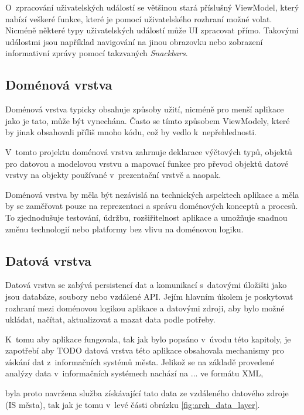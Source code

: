 O~zpracování uživatelských událostí se většinou stará příslušný ViewModel, který nabízí veškeré funkce, které je pomocí uživatelského rozhraní možné volat.
Nicméně některé typy uživatelských událostí může UI zpracovat přímo. Takovými událostmi jsou například navigování na jinou obrazovku nebo zobrazení 
informativní zprávy pomocí takzvaných \textit{Snackbars}.

\subsection*{Doménová vrstva}
Doménová vrstva typicky obsahuje způsoby užití, nicméně pro menší aplikace jako je tato, může být vynechána. Často se tímto způsobem  ViewModely,
které by jinak obsahovali příliš mnoho kódu, což by vedlo k~nepřehlednosti.

V~tomto projektu doménová vrstva zahrnuje deklarace výčtových typů, objektů pro datovou a modelovou vrstvu a mapovací funkce pro převod
objektů datové vrstvy na objekty používané v~prezentační vrstvě a naopak.

Doménová vrstva by měla být nezávislá na technických aspektech aplikace a měla by se zaměřovat pouze na reprezentaci a správu doménových
 konceptů a procesů. To zjednodušuje testování, údržbu, rozšiřitelnost aplikace a umožňuje snadnou změnu technologií nebo platformy bez 
 vlivu na doménovou logiku.

\subsection*{Datová vrstva}


Datová vrstva se zabývá persistencí dat a komunikací s~datovými úložišti jako jsou
databáze, soubory nebo vzdálené API. Jejím hlavním úkolem je poskytovat rozhraní mezi doménovou logikou aplikace a datovými zdroji, 
aby bylo možné ukládat, načítat, aktualizovat a mazat data podle potřeby.

K~tomu aby aplikace fungovala, tak jak bylo popsáno v~úvodu této kapitoly, je zapotřebí aby  TODO datová vrstva této aplikace obsahovala mechanismy pro
 získání dat z~informačních systémů města. Jelikož se na základě provedené analýzy data v~informačních systémech nachází na ... ve formátu XML, 


 byla proto navržena služba získávající tato data ze vzdáleného datového zdroje (IS města), tak jak je tomu v~levé části obrázku \ref{fig:arch_data_layer}. 

